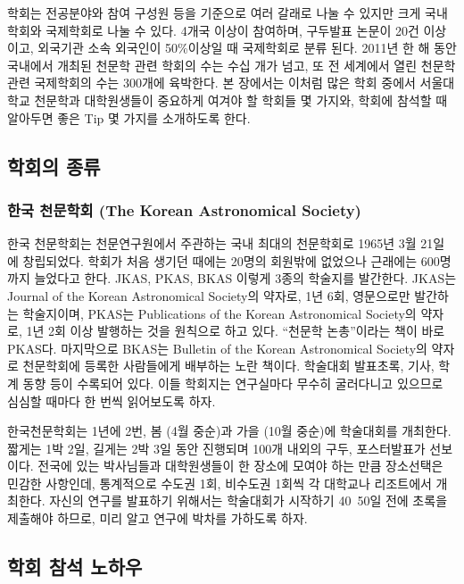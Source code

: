 학회는 전공분야와 참여 구성원 등을 기준으로 여러 갈래로 나눌 수 있지만 크게
국내학회와 국제학회로 나눌 수 있다. 4개국 이상이 참여하며, 구두발표 논문이 20건
이상이고, 외국기관 소속 외국인이 50\%이상일 때 국제학회로 분류 된다. 2011년 한 해
동안 국내에서 개최된 천문학 관련 학회의 수는 수십 개가 넘고, 또 전 세계에서 열린
천문학 관련 국제학회의 수는 300개에 육박한다. 본 장에서는 이처럼 많은 학회 중에서
서울대학교 천문학과 대학원생들이 중요하게 여겨야 할 학회들 몇 가지와, 학회에
참석할 때 알아두면 좋은 Tip 몇 가지를 소개하도록 한다.
 
\subsection{학회의 종류}
\subsubsection{한국 천문학회 (The Korean Astronomical Society)}
한국 천문학회는 천문연구원에서 주관하는 국내 최대의 천문학회로 1965년 3월 21일 에
창립되었다. 학회가 처음 생기던 때에는 20명의 회원밖에 없었으나 근래에는 600명까지
늘었다고 한다. JKAS, PKAS, BKAS 이렇게 3종의 학술지를 발간한다. JKAS는 Journal
of the Korean Astronomical Society의 약자로, 1년 6회, 영문으로만 발간하는
학술지이며, PKAS는 Publications of the Korean Astronomical Society의 약자로, 1년
2회 이상 발행하는 것을 원칙으로 하고 있다. “천문학 논총”이라는 책이 바로
PKAS다. 마지막으로 BKAS는 Bulletin of the Korean Astronomical Society의 약자로
천문학회에 등록한 사람들에게 배부하는 노란 책이다. 학술대회 발표초록, 기사, 학계
동향 등이 수록되어 있다. 이들 학회지는 연구실마다 무수히 굴러다니고 있으므로
심심할 때마다 한 번씩 읽어보도록 하자.

한국천문학회는 1년에 2번, 봄 (4월 중순)과 가을 (10월 중순)에 학술대회를
개최한다. 짧게는 1박 2일, 길게는 2박 3일 동안 진행되며 100개 내외의 구두,
포스터발표가 선보이다. 전국에 있는 박사님들과 대학원생들이 한 장소에 모여야 하는
만큼 장소선택은 민감한 사항인데, 통계적으로 수도권 1회, 비수도권 1회씩 각
대학교나 리조트에서 개최한다. 자신의 연구를 발표하기 위해서는 학술대회가 시작하기
40~50일 전에 초록을 제출해야 하므로, 미리 알고 연구에 박차를 가하도록 하자.

\subsection{학회 참석 노하우}

